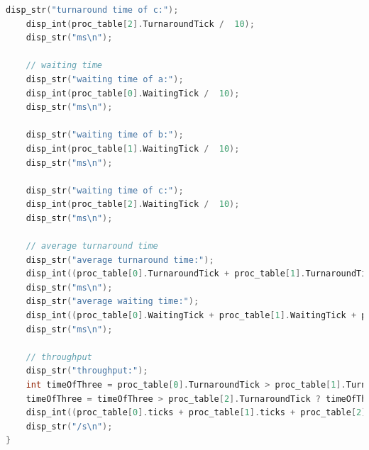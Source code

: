 \begin{enumerate}
\begin{lstlisting}[language = C]
    disp_str("turnaround time of c:");
    disp_int(proc_table[2].TurnaroundTick /  10);
    disp_str("ms\n");

    // waiting time
    disp_str("waiting time of a:");
    disp_int(proc_table[0].WaitingTick /  10);
    disp_str("ms\n");

    disp_str("waiting time of b:");
    disp_int(proc_table[1].WaitingTick /  10);
    disp_str("ms\n");

    disp_str("waiting time of c:");
    disp_int(proc_table[2].WaitingTick /  10);
    disp_str("ms\n");

    // average turnaround time
    disp_str("average turnaround time:");
    disp_int((proc_table[0].TurnaroundTick + proc_table[1].TurnaroundTick + proc_table[2].TurnaroundTick / 30) / 30);
    disp_str("ms\n");
    disp_str("average waiting time:");
    disp_int((proc_table[0].WaitingTick + proc_table[1].WaitingTick + proc_table[2].WaitingTick) / 30);
    disp_str("ms\n");

    // throughput
    disp_str("throughput:");
    int timeOfThree = proc_table[0].TurnaroundTick > proc_table[1].TurnaroundTick ? proc_table[0].TurnaroundTick : proc_table[1].TurnaroundTick;
    timeOfThree = timeOfThree > proc_table[2].TurnaroundTick ? timeOfThree : proc_table[2].TurnaroundTick;
    disp_int((proc_table[0].ticks + proc_table[1].ticks + proc_table[2].ticks)/ timeOfThree);
    disp_str("/s\n");
}
\end{lstlisting}
\end{enumerate}

